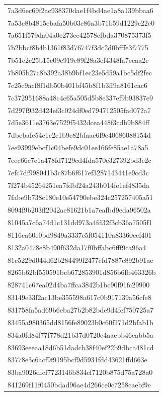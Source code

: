 \begin{tabular}{l}
7a3d6ec69f2ac938370dae1f4bd4ae1a8a139bbaa6 \\
7a53c8b4815ebafa50b03c86a3b71b59d1229c22e0 \\
7a651f579da04a0e273ee42578cfbda370875373f5 \\
7b2bbcf8b4b1361f83d76747f3dc2d0bfffe3f7775 \\
7b51c2c25b15e09e919c89f28a3ef4348fa7ecaa2c \\
7b805b27c8b392a38b9bf1ec23e5d59a1bc5df2fec \\
7c25c9acf8f1db50b401bf45b8f1b3ff9a8161cac6 \\
7c372951688a48c4c65a505d5b8e337ef9b93837e9 \\
7d297f932d424ef3c024df0ed794712505fad072a7 \\
7d5e3611e3763e7529f5432dcea448f3cdb9b884ff \\
7dbebafe54c1c2e1b9e82bfaac6f9e40686088154d \\
7ee93999ebcf1c04befe9dc01ee166fe85ae1a78a5 \\
7eec66c7e1a478fd7129cd4fda570e327392bd3c2c \\
7efc7df998041b3c87b6f617ef3287143441e9cd3c \\
7f274b45264251ea7fdbf24a243b014fe1ef4835da \\
7fabe9b738c180e10e54790ebe324c257257405a51 \\
8094f9b203ff2042ae81621b1a7eafbd9eda96502a \\
81045a7c6a74d1c131dd973a4fd32f3cb36a7505f1 \\
8116ca60e0bd9849a3337c5f054110a83360cef401 \\
8132a0478e8b490f632da17f0bffabc6fff9ca96a4 \\
81c5229d044d62b284499f2477efd7887c892b91ae \\
8265b62bf550591beb672853901d856b6fb463326b \\
828741c67ea02d4ba7ffca3842b1bc90f91fc29900 \\
83149e33f2ac13be355598a617c0b917139a56cfe8 \\
831758fa5ad69b6eba27b2b82bde9d4fef750725a7 \\
83455a980365dd8156fe89023b0c60f171d2bfab1b \\
834a0fd84f77f778d21b37d0720e4aaebb46eabb5a \\
83693eeeaa18d6b51dadcb38f40ef22b9dbca481cd \\
83778e3c6acf9f9195bcf9d5931fdd43621ffd663e \\
83ba9026dfcf7723146b834ef7120b875d75a728a0 \\
841269f11f0450bdad96ae4d266ce0c7258caebf9e \\

\end{tabular}
